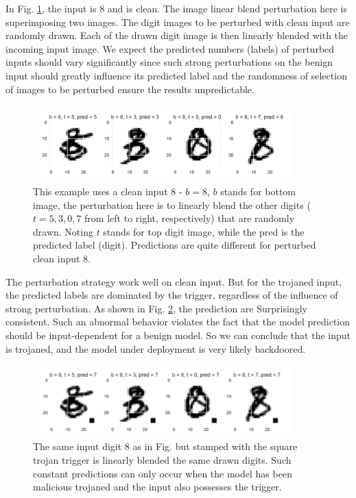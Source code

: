\documentclass[letterpaper]{article}
\begin{document}
In Fig. \ref{fig:strip_2}, the input is 8 and is clean. The image linear blend perturbation here is superimposing two images. The digit images to be perturbed with clean input are randomly drawn. Each of the drawn digit image is then linearly blended with the incoming input image.
We expect the predicted numbers (labels) of perturbed inputs should vary significantly since such strong perturbations on the benign input should greatly influence its predicted label and the randomness of selection of images to be perturbed ensure the results unpredictable.

\begin{figure}[H]
    \centering
    \includegraphics[width=10cm]{img/strip_2.png}
    \caption{This example uses a clean input 8 - $b=8$, $b$ stands for bottom image, the perturbation here is to linearly blend the other digits ($t=5,3,0,7$ from left to right, respectively) that are randomly drawn. Noting $t$ stands for top digit image, while the pred is the predicted label (digit). Predictions are quite different for perturbed clean input 8.}
    \label{fig:strip_2}
\end{figure}

The perturbation strategy work well on clean input. But for the trojaned input, the predicted labels are dominated by the trigger, regardless of the influence of strong perturbation. As shown in Fig. \ref{fig:strip_3}, the prediction are Surprisingly consistent. Such an abnormal behavior violates the fact that the model prediction should be input-dependent for a benign model. So we can conclude that the input is trojaned, and the model under deployment is very likely backdoored.

\begin{figure}[H]
    \centering
    \includegraphics[width=10cm]{img/strip_3.png}
    \caption{The same input digit 8 as in Fig. \label{fig:strip_2} but stamped with the square trojan trigger is linearly blended the same drawn digits. Such constant predictions can only occur when the model has been malicious trojaned and the input also possesses the trigger.}
    \label{fig:strip_3}
\end{figure}
\end{document}
